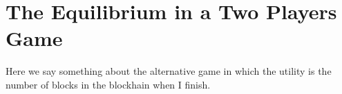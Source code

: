 
\section{The Equilibrium in a Two Players Game}
\label{sec-twoplayers}

Here we say something about the alternative game in which the utility is the number of blocks in the blockhain when I finish. 